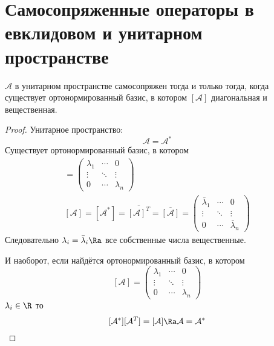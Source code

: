 \section{Самосопряженные операторы в евклидовом и унитарном пространстве}

\begin{theorem}
	$\mathcal A$ в унитарном пространстве самосопряжен тогда и только тогда, когда
	существует ортонормированный базис, в котором $[\mathcal A]$ диагональная и вещественная.
\end{theorem}
\begin{proof}
	Унитарное пространство:
	\[ \mathcal A = \mathcal{A}^* \]
	Существует ортонормированный базис, в котором
	\begin{gather*}
		[\mathcal A]
		= \begin{pmatrix}
			\lambda_1 & \cdots & 0 \\
			\vdots & \ddots & \vdots \\
			0 & \cdots & \lambda_n
		\end{pmatrix} \\
		[\mathcal A]
		= [\mathcal{A}^*]
		= \overline{[\mathcal A]^T}
		= \overline{[\mathcal A]}
		= \begin{pmatrix}
			\bar\lambda_1 & \cdots & 0 \\
			\vdots & \ddots & \vdots \\
			0 & \cdots & \bar\lambda_n
		\end{pmatrix}
	\end{gather*}
	Следовательно $\lambda_i = \bar \lambda_i \Ra$ все собственные числа вещественные. 
	
	И наоборот, если найдётся ортонормированный базис, в котором
	\[
		[\mathcal A]
		= \begin{pmatrix}
			\lambda_1 & \cdots & 0 \\
			\vdots & \ddots & \vdots \\
			0 & \cdots & \lambda_n
		\end{pmatrix}
	\]
	$\lambda_i \in \R$ 
	то
	\[
		[\mathcal A^*][\mathcal{A}^T] = [\mathcal A] \Ra \mathcal A = \mathcal{A}^*
	\]
\end{proof}

